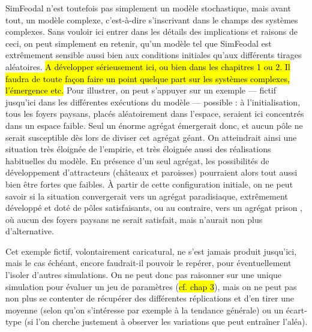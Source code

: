 	SimFeodal n'est toutefois pas simplement un modèle stochastique, mais avant tout, un modèle complexe, c'est-à-dire s'inscrivant dans le champs des systèmes complexes. Sans vouloir ici entrer dans les détails des implications et raisons de ceci, on peut simplement en retenir, qu'un modèle tel que SimFeodal est extrêmement sensible aussi bien aux conditions initiales qu'aux différents tirages aléatoires.
	\hl{A développer sérieusement ici, ou bien dans les chapitres 1 ou 2. Il faudra de toute façon faire un point quelque part sur les systèmes complexes, l'émergence etc.}
	Pour illustrer, on peut s'appuyer sur un exemple ---
	fictif jusqu'ici dans les différentes exécutions du modèle
	--- possible : à l'initialisation, tous les foyers paysans, placés aléatoirement dans l'espace, seraient ici concentrés dans un espace faible.
	Seul un énorme agrégat émergerait donc, et aucun pôle ne serait susceptible dès lors de diviser cet agrégat géant.
	On atteindrait ainsi une situation très éloignée de l'empirie, et très éloignée aussi des réalisations habituelles du modèle.
	En présence d'un seul agrégat, les possibilités de développement d'attracteurs (châteaux et paroisses) pourraient alors tout aussi bien être fortes que faibles.
	À partir de cette configuration initiale, on ne peut savoir si la situation convergerait vers un agrégat \og paradisiaque\fg{}, extrêmement développé et doté de pôles satisfaisants, ou au contraire, vers un agrégat \og prison \fg{}, où aucun des foyers paysans ne serait satisfait, mais n'aurait non plus d'alternative.

	Cet exemple fictif, volontairement caricatural, ne s'est jamais produit jusqu'ici, mais le cas échéant, encore faudrait-il pouvoir le repérer, pour éventuellement l'isoler d'autres simulations.
	On ne peut donc pas raisonner sur une unique simulation pour évaluer un jeu de paramètres (\hl{cf. chap 3}), mais on ne peut pas non plus se contenter de récupérer des différentes réplications et d'en tirer une moyenne (selon qu'on s'intéresse par exemple à la tendance générale) ou un écart-type (si l'on cherche justement à observer les variations que peut entraîner l'aléa).

